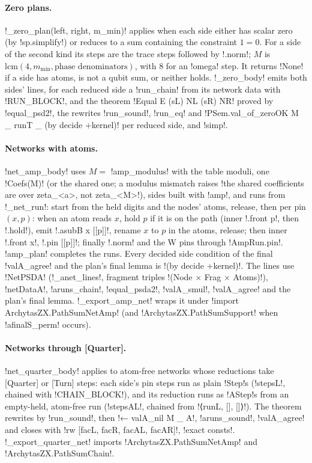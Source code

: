 {{{\paragraph{Zero plans.} \lexpy!_zero_plan(left, right, m_min)! applies when each side either has
scalar zero (by \lexpy!sp.simplify!) or reduces to a sum containing the constraint $1=0$. For a
side of the second kind its steps are the trace steps followed by \lexlean!.norm!; $M$ is
$\mathrm{lcm}(4, m_{\min}, \text{phase denominators})$, with 8 for an \lexcode!omega! step. It returns
\lexpy!None! if a side has atoms, is not a qubit sum, or neither holds. \lexpy!_zero_body! emits both
sides' lines, for each reduced side a \lexlean!run_chain! from its network data with
\lexpy!RUN_BLOCK!, and the theorem \lexlean!Equal E (sL) NL (sR) NR! proved by \lexlean!equal_psd2!, the
rewrites \lexlean!run_sound!, \lexlean!run_eq! and \lexlean!PSem.val_of_zeroOK M _ runT _ (by decide +kernel)!
per reduced side, and \lexlean!simp!.

\paragraph{Networks with atoms.} \lexpy!net_amp_body! uses $M = $ \lexpy!amp_modulus! with the table
moduli, one \lexpy!Coefs(M)! (or the shared one; a modulus mismatch raises \lexcode!the shared coefficients are over zeta_<a>, not zeta_<M>!), sides built with \lexcode!amp!, and runs from
\lexpy!_net_run!: start from the held digits and the nodes' atoms, release, then per pin $(x, p)$:
when an atom reads $x$, hold $p$ if it is on the path (inner \lexlean!.front p!, then
\lexlean!.hold!), emit \lexlean!.asubB x [[p]]!, rename $x$ to $p$ in the atoms, release; then
inner \lexlean!.front x!, \lexlean!.pin [[p]]!; finally \lexlean!.norm! and the W pins through
\lexpy!AmpRun.pin!. \lexpy!amp_plan! completes the runs. Every decided side condition of the final
\lexlean!valA_agree! and the plan's final lemma is \lexlean!(by decide +kernel)!. The
lines use \lexlean!NetPSDA! (\lexpy!_anet_lines!, fragment triples \lexlean!(Node × Frag × Atoms)!),
\lexlean!netDataA!, \lexlean!aruns_chain!, \lexlean!equal_psda2!, \lexlean!valA_smul!, \lexlean!valA_agree! and
the plan's final lemma. \lexpy!_export_amp_net! wraps it under \lexlean!import ArchytasZX.PathSumNetAmp!
(and \lexlean!ArchytasZX.PathSumSupport! when \lexlean!afinalS_perm! occurs).

\paragraph{Networks through [Quarter].} \lexpy!net_quarter_body! applies to atom-free networks
whose reductions take [Quarter] or [Turn] steps: each side's pin steps run as plain
\lexlean!Step!s (\lexlean!stepsL!, chained with \lexpy!CHAIN_BLOCK!), and its reduction runs as
\lexlean!AStep!s from an empty-held, atom-free run (\lexlean!stepsAL!, chained from
\lexlean!⟨runL, [], []⟩!). The theorem rewrites by \lexlean!run_sound!, then \lexlean!← valA_nil M _ A!,
\lexlean!aruns_sound!, \lexlean!valA_agree! and closes with \lexlean!rw [facL, facR, facAL, facAR]!,
\lexlean!exact consts!. \lexpy!_export_quarter_net! imports \lexlean!ArchytasZX.PathSumNetAmp! and
\lexlean!ArchytasZX.PathSumChain!.

}}}
